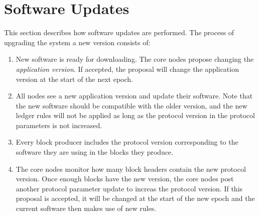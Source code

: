 \section{Software Updates}
\label{sec:software-updates}

This section describes how software updates are performed.
The process of upgrading the system a new version consists of:

\begin{enumerate}
  \item New software is ready for downloading. The core nodes propose changing the
    \textit{application version}. If accepted, the proposal
    will change the application version at the start of the next epoch.
  \item All nodes see a new application version and update their software.
    Note that the new software should be compatible with the older version, and the new
    ledger rules will not be applied as long as the protocol version in the
    protocol parameters is not increased.
  \item Every block producer includes the protocol version corresponding to the software
    they are using in the blocks they produce.
  \item The core nodes monitor how many block headers contain the new protocol version.
    Once enough blocks have the new version, the core nodes post another protocol parameter
    update to increas the protocol version.
    If this proposal is accepted, it will be changed at the start of the new epoch and
    the current software then makes use of new rules.
\end{enumerate}
